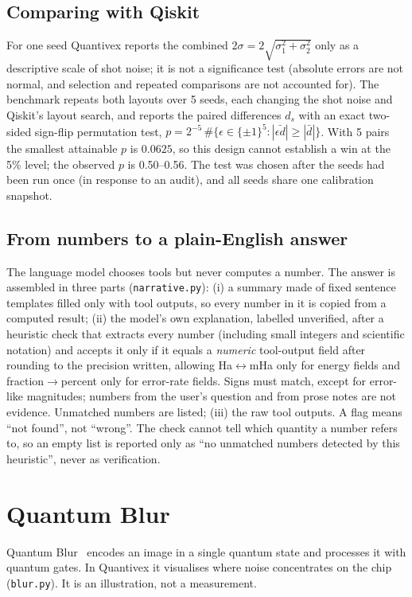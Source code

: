 \documentclass[10pt,a4paper]{article}
\newcommand{\code}[1]{\texttt{\small #1}}
\begin{document}
\subsection{Comparing with Qiskit}
For one seed Quantivex reports the combined $2\sigma=2\sqrt{\sigma_1^2+\sigma_2^2}$ only as a descriptive scale of shot noise; it is not a significance test (absolute errors are not normal, and selection and repeated comparisons are not accounted for). The benchmark repeats both layouts over 5 seeds, each changing the shot noise and Qiskit's layout search, and reports the paired differences $d_s$ with an exact two-sided sign-flip permutation test, $p=2^{-5}\,\#\{\epsilon\in\{\pm1\}^5:|\bar{\epsilon d}|\ge|\bar d|\}$. With 5 pairs the smallest attainable $p$ is $0.0625$, so this design cannot establish a win at the 5\% level; the observed $p$ is 0.50--0.56. The test was chosen after the seeds had been run once (in response to an audit), and all seeds share one calibration snapshot.

\subsection{From numbers to a plain-English answer}
The language model chooses tools but never computes a number. The answer is assembled in three parts (\code{narrative.py}): (i) a summary made of fixed sentence templates filled only with tool outputs, so every number in it is copied from a computed result; (ii) the model's own explanation, labelled unverified, after a heuristic check that extracts every number (including small integers and scientific notation) and accepts it only if it equals a \emph{numeric} tool-output field after rounding to the precision written, allowing Ha$\leftrightarrow$mHa only for energy fields and fraction$\to$percent only for error-rate fields. Signs must match, except for error-like magnitudes; numbers from the user's question and from prose notes are not evidence. Unmatched numbers are listed; (iii) the raw tool outputs. A flag means ``not found'', not ``wrong''. The check cannot tell which quantity a number refers to, so an empty list is reported only as ``no unmatched numbers detected by this heuristic'', never as verification.

\section{Quantum Blur}\label{sec:blur}
Quantum Blur~\cite{Wootton2020,Wootton2021} encodes an image in a single quantum state and processes it with quantum gates. In Quantivex it visualises where noise concentrates on the chip (\code{blur.py}). It is an illustration, not a measurement.
\end{document}
